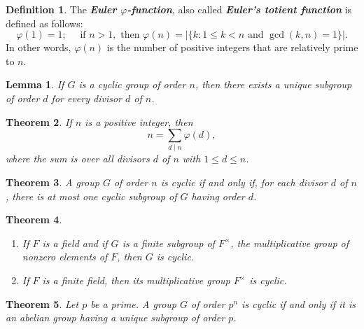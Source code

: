 \documentclass[12pt]{report}
\newtheorem{theorem}{Theorem}[chapter]
\newtheorem{lemma}[theorem]{Lemma}
\theoremstyle{definition}
\newtheorem*{definition}{Definition}
\newcommand{\term}[1]{\textbf{\textit{#1}}}
\renewcommand{\labelenumi}{\textnormal{(\roman{enumi})}}
\begin{document}
\begin{definition}
	The \term{Euler $\varphi$-function}, also called \term{Euler's totient function} is defined as follows:
	\[ \varphi(1)=1;\quad\text{ if }n>1,\text{ then }\varphi(n)=|\{k:1\leq k<n\text{ and }\gcd(k, n)=1\}|. \]
	In other words, $\varphi(n)$ is the number of positive integers that are relatively prime to $n$.
\end{definition}

\begin{lemma}
	If $G$ is a cyclic group of order $n$, then there exists a unique subgroup of order $d$ for every divisor $d$ of $n$.
\end{lemma}

\begin{theorem}
	If $n$ is a positive integer, then
	\[ n=\sum_{d\mid n} \varphi(d), \]
	where the sum is over all divisors $d$ of $n$ with $1\leq d\leq n$.
\end{theorem}

\begin{theorem}
	A group $G$ of order $n$ is cyclic if and only if, for each divisor $d$ of $n$, there is at most one cyclic subgroup of $G$ having order $d$.
\end{theorem}

\begin{theorem}
	\quad
	\renewcommand{\labelenumi}{\textnormal{(\roman{enumi})}}
	\begin{enumerate}
		\item If $F$ is a field and if $G$ is a finite subgroup of $F^\times$, the multiplicative group of nonzero elements of $F$, then $G$ is cyclic.
		\item If $F$ is a finite field, then its multiplicative group $F^\times$ is cyclic.
	\end{enumerate}
\end{theorem}

\begin{theorem}
	Let $p$ be a prime. A group $G$ of order $p^n$ is cyclic if and only if it is an abelian group having a unique subgroup of order $p$.
\end{theorem}
\end{document}
